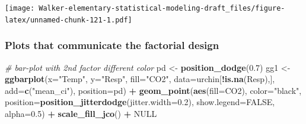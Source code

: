 \documentclass[]{book}
\newenvironment{Shaded}{\begin{snugshade}}{\end{snugshade}}
\newcommand{\CommentTok}[1]{\textcolor[rgb]{0.56,0.35,0.01}{\textit{#1}}}
\newcommand{\DataTypeTok}[1]{\textcolor[rgb]{0.13,0.29,0.53}{#1}}
\newcommand{\FloatTok}[1]{\textcolor[rgb]{0.00,0.00,0.81}{#1}}
\newcommand{\KeywordTok}[1]{\textcolor[rgb]{0.13,0.29,0.53}{\textbf{#1}}}
\newcommand{\NormalTok}[1]{#1}
\newcommand{\OperatorTok}[1]{\textcolor[rgb]{0.81,0.36,0.00}{\textbf{#1}}}
\newcommand{\OtherTok}[1]{\textcolor[rgb]{0.56,0.35,0.01}{#1}}
\newcommand{\StringTok}[1]{\textcolor[rgb]{0.31,0.60,0.02}{#1}}
\begin{document}
\texttt{[image: Walker-elementary-statistical-modeling-draft\_files/figure-latex/unnamed-chunk-121-1.pdf]}

\hypertarget{plots-that-communicate-the-factorial-design}{%
\subsubsection{Plots that communicate the factorial design}\label{plots-that-communicate-the-factorial-design}}

\begin{Shaded}
\begin{Highlighting}[]
\CommentTok{# bar-plot with 2nd factor different color}
\NormalTok{pd <-}\StringTok{ }\KeywordTok{position_dodge}\NormalTok{(}\FloatTok{0.7}\NormalTok{)}
\NormalTok{gg1 <-}\StringTok{ }\KeywordTok{ggbarplot}\NormalTok{(}\DataTypeTok{x=}\StringTok{"Temp"}\NormalTok{,}
          \DataTypeTok{y=}\StringTok{"Resp"}\NormalTok{,}
          \DataTypeTok{fill=}\StringTok{"CO2"}\NormalTok{,}
          \DataTypeTok{data=}\NormalTok{urchin[}\OperatorTok{!}\KeywordTok{is.na}\NormalTok{(Resp),],}
          \DataTypeTok{add=}\KeywordTok{c}\NormalTok{(}\StringTok{"mean_ci"}\NormalTok{),}
          \DataTypeTok{position=}\NormalTok{pd) }\OperatorTok{+}
\StringTok{  }\KeywordTok{geom_point}\NormalTok{(}\KeywordTok{aes}\NormalTok{(}\DataTypeTok{fill=}\NormalTok{CO2), }
             \DataTypeTok{color=}\StringTok{"black"}\NormalTok{, }
             \DataTypeTok{position=}\KeywordTok{position_jitterdodge}\NormalTok{(}\DataTypeTok{jitter.width=}\FloatTok{0.2}\NormalTok{), }
             \DataTypeTok{show.legend=}\OtherTok{FALSE}\NormalTok{, }
             \DataTypeTok{alpha=}\FloatTok{0.5}\NormalTok{) }\OperatorTok{+}
\StringTok{  }\KeywordTok{scale_fill_jco}\NormalTok{() }\OperatorTok{+}
\StringTok{  }\OtherTok{NULL}


\end{Highlighting}
\end{Shaded}
\end{document}
